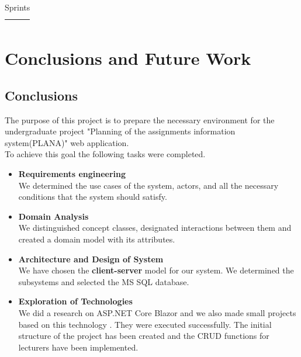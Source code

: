 \documentclass{scrartcl}
\begin{document}
\begin{table}[H]
\begin{center}
\begin{tabular}{| p{2.5cm}| p{12cm} |}
\begin{itemize}
 \end{itemize}\\ \hline
 
\end{tabular}
\end{center}
\caption{Sprints}
\label{table2}
\end{table}



\section{Conclusions and Future Work}
\subsection{Conclusions}
   The purpose of this project is to prepare the necessary environment for the  undergraduate project "Planning of the assignments information system(PLANA)" web application.\\
   To achieve this goal the following tasks were completed.
   \begin{itemize}
    
   \item \textbf{ Requirements engineering } \\
   We determined the use cases of the system, actors, and all the necessary conditions that the system should satisfy.
   \item \textbf{ Domain Analysis }\\
  We distinguished concept classes, designated interactions between them and created a domain model with its attributes.
   \item \textbf{ Architecture and Design of System}\\
   We have chosen the  \textbf{client-server} model for our system. We determined the subsystems and selected the MS SQL database.
   \item \textbf{ Exploration of Technologies } \\
   We did a research on ASP.NET Core Blazor and we also 
     made small projects based on this technology . They were executed 	 successfully.
    The initial structure of the project has been created and the CRUD functions  for lecturers have been implemented.
    \end{itemize}
    
\end{document}
